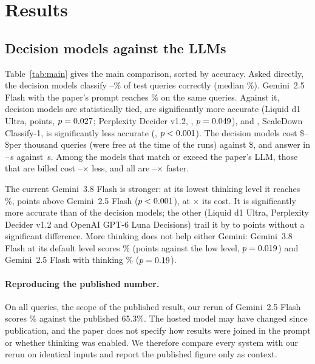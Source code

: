 \section{Results}
\label{sec:results}



\subsection{Decision models against the LLMs}
\label{sec:main}

Table~\ref{tab:main} gives the main comparison, sorted by accuracy. Asked directly, the \ndm decision models
classify \dmaccmin--\dmaccmax\% of test queries correctly (median \dmaccmedian\%). Gemini~2.5 Flash with the paper's
prompt reaches \gtwofiveacc\% on the same queries. Against it, \ntiedref decision models are statistically tied,
\nbetterref are significantly more accurate (Liquid d1 Ultra, \liquidultravsrefdiff points, $p=0.027$;
Perplexity Decider v1.2, \pplxvsrefdiff, $p=0.049$), and \nworseref, ScaleDown Classify-1, is significantly
less accurate (\scaledownvsrefdiff, $p<0.001$). The decision models cost \$\dmcostmin--\$\dmcostmax per
thousand queries (\nfree were free at the time of the runs) against \$\gtwofivecost, and answer in
\dmlatmin--\dmlatmax\,s against \gtwofivelat\,s. Among the \natpar models that match or exceed the paper's LLM,
those that are billed cost \costratiorefmin--\costratiorefmax$\times$ less, and all are
\latratiorefmin--\latratiorefmax$\times$ faster.

The current Gemini~3.8 Flash is stronger: at its lowest thinking level it reaches \gthreeeightacc\%,
\gthreeeightvstwofivediff points above Gemini~2.5 Flash ($p<0.001$), at \costratiorefnow$\times$ its
cost. It is significantly more accurate than \nworsenow of the decision models; the other \ntiednow (Liquid d1
Ultra, Perplexity Decider v1.2 and OpenAI GPT-6 Luna Decisions) trail it by \liquidultravsnowdiffabs to
\lunavsnowdiffabs points without a significant difference. More thinking does not help either Gemini: Gemini~3.8
Flash at its default level scores \gthreeeightdefaultacc\% (\gthinkvsnothinkdiff points against the low level,
$p=0.019$) and Gemini~2.5 Flash with thinking \gtwofivethinkacc\% ($p=0.19$).

\paragraph{Reproducing the published number.} On all \nall queries, the scope of the published result, our rerun of
Gemini~2.5 Flash scores \allgtwofive\% against the published 65.3\%. The hosted model may have changed since
publication, and the paper does not specify how results were joined in the prompt or whether thinking was enabled.
We therefore compare every system with our rerun on identical inputs and report the published figure only as
context.

